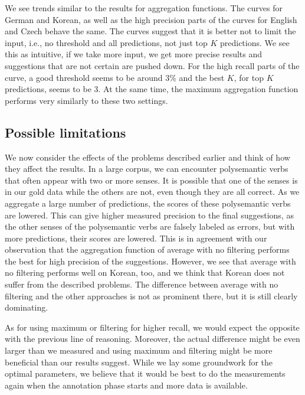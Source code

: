We see trends similar to the results for aggregation functions. The curves for German and Korean, as well as the high precision parts of the curves for English and Czech behave the same. The curves suggest that it is better not to limit the input, i.e., no threshold and all predictions, not just top $K$ predictions. We see this as intuitive, if we take more input, we get more precise results and suggestions that are not certain are pushed down. For the high recall parts of the curve, a good threshold seems to be around 3\% and the best $K$, for top $K$ predictions, seems to be 3. At the same time, the maximum aggregation function performs very similarly to these two settings.

\subsection{Possible limitations}

We now consider the effects of the problems described earlier and think of how they affect the results. In a large corpus, we can encounter polysemantic verbs that often appear with two or more senses. It is possible that one of the senses is in our gold data while the others are not, even though they are all correct. As we aggregate a large number of predictions, the scores of these polysemantic verbs are lowered. This can give higher measured precision to the final suggestions, as the other senses of the polysemantic verbs are falsely labeled as errors, but with more predictions, their scores are lowered. This is in agreement with our observation that the aggregation function of average with no filtering performs the best for high precision of the suggestions. However, we see that average with no filtering performs well on Korean, too, and we think that Korean does not suffer from the described problems. The difference between average with no filtering and the other approaches is not as prominent there, but it is still clearly dominating.

As for using maximum or filtering for higher recall, we would expect the opposite with the previous line of reasoning. Moreover, the actual difference might be even larger than we measured and using maximum and filtering might be more beneficial than our results suggest. While we lay some groundwork for the optimal parameters, we believe that it would be best to do the measurements again when the annotation phase starts and more data is available.


